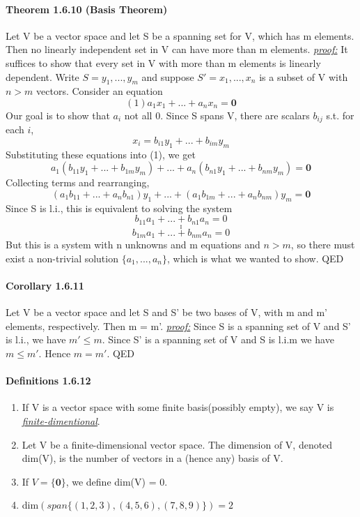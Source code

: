 \documentclass[11pt]{article}
\newcommand{\ti}[1]{\textit{#1}}
\newcommand{\tb}[1]{\textbf{#1}}
\newcommand{\under}[1]{\underline{#1}}
\newcommand{\proof}[0]{\textit{\underline{proof:} }}
\begin{document}
	\paragraph{Theorem 1.6.10 (Basis Theorem)} Let V be a vector space and let S be a spanning set for V, which has m elements. Then no linearly independent set in V can have more than m elements.\newline
	\ti{\under{proof:}} It suffices to show that every set in V with more than m elements is linearly dependent. Write $S = {y_1, ..., y_m}$ and suppose $S' = {x_1, ..., x_n}$ is a subset of V with $n >m$ vectors. Consider an equation
	$$(1)a_1x_1 + ... + a_nx_n = \tb{0}$$
	Our goal is to show that $a_i$ not all 0.
	Since S spans V, there are scalars $b_{ij}$ s.t. for each $i$,
	$$x_i = b_{i1}y_1 + ... +b_{im}y_m$$
	Substituting these equations into (1), we get $$a_1(b_{11}y_1+...+b_{1m}y_m)+...+a_n(b_{n1}y_1+...+b_{nm}y_m)=\tb{0}$$
	Collecting terms and rearranging,
	$$(a_1b_{11}+...+a_nb_{n1})y_1+...+(a_1b_{1m}+...+a_nb_{nm})y_m = \tb{0}$$
	Since S is l.i., this is equivalent to solving the system
	$$b_{11}a_1+...+b_{n1}a_n = 0$$
	$$.$$
	$$.$$
	$$.$$
	$$b_{1m}a_1+...+b_{nm}a_n=0$$
	But this is a system with n unknowns and m equations and $n>m$, so there must exist a non-trivial solution $\{a_1,...,a_n\}$, which is what we wanted to show. QED
	\paragraph{Corollary 1.6.11} Let V be a vector space and let S and S' be two bases of V, with m and m' elements, respectively. Then m = m'.\newline
	\proof\newline
	Since S is a spanning set of V and S' is l.i., we have $m'\leq m$. Since S' is a spanning set of V and S is l.i.m we have $m \leq m'$. Hence $m = m'$. QED
	\paragraph{Definitions 1.6.12}
	\begin{enumerate}
		\item If V is a vector space with some finite basis(possibly empty), we say V is \under{\it{finite-dimentional}}.
		\item Let V be a finite-dimensional vector space. The dimension of V, denoted dim(V), is the number of vectors in a (hence any) basis of V.
		\item If $V = \{\tb{0}\}$, we define dim(V) = 0.
		\item dim$(span\{(1,2,3),(4,5,6),(7,8,9)\}) = 2$
	\end{enumerate}
\end{document}

